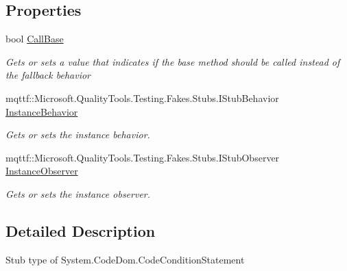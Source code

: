 \subsection*{Properties}
\begin{DoxyCompactItemize}
\item 
bool \hyperlink{class_system_1_1_code_dom_1_1_fakes_1_1_stub_code_condition_statement_ad62ab50fe6e6b523490759909e17e56a}{Call\-Base}
\begin{DoxyCompactList}\small\item\em Gets or sets a value that indicates if the base method should be called instead of the fallback behavior\end{DoxyCompactList}\item 
mqttf\-::\-Microsoft.\-Quality\-Tools.\-Testing.\-Fakes.\-Stubs.\-I\-Stub\-Behavior \hyperlink{class_system_1_1_code_dom_1_1_fakes_1_1_stub_code_condition_statement_a530744f7d13f913b4fc7f23df96c3136}{Instance\-Behavior}
\begin{DoxyCompactList}\small\item\em Gets or sets the instance behavior.\end{DoxyCompactList}\item 
mqttf\-::\-Microsoft.\-Quality\-Tools.\-Testing.\-Fakes.\-Stubs.\-I\-Stub\-Observer \hyperlink{class_system_1_1_code_dom_1_1_fakes_1_1_stub_code_condition_statement_a1dddd75903a624c2596f089653c872c4}{Instance\-Observer}
\begin{DoxyCompactList}\small\item\em Gets or sets the instance observer.\end{DoxyCompactList}\end{DoxyCompactItemize}


\subsection{Detailed Description}
Stub type of System.\-Code\-Dom.\-Code\-Condition\-Statement



